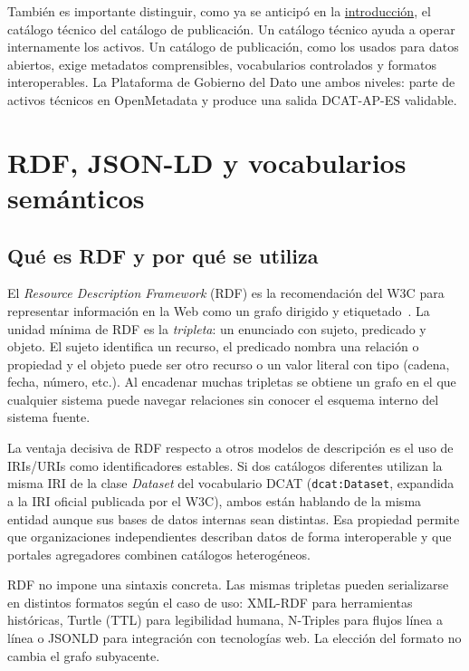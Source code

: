 También es importante distinguir, como ya se anticipó en la \hyperref[cap:introduccion]{introducción}, el catálogo técnico del catálogo de publicación. Un catálogo técnico ayuda a operar internamente los activos. Un catálogo de publicación, como los usados para datos abiertos, exige metadatos comprensibles, vocabularios controlados y formatos interoperables. La Plataforma de Gobierno del Dato une ambos niveles: parte de activos técnicos en OpenMetadata y produce una salida DCAT-AP-ES validable.

\section{RDF, JSON-LD y vocabularios semánticos}\label{sec:rdf-semantica}

\subsection{Qué es RDF y por qué se utiliza}

El \emph{Resource Description Framework} (\acs{RDF}) es la recomendación del \ac{W3C} para representar información en la Web como un grafo dirigido y etiquetado~\cite{w3cRdf11}. La unidad mínima de \ac{RDF} es la \emph{tripleta}: un enunciado con sujeto, predicado y objeto. El sujeto identifica un recurso, el predicado nombra una relación o propiedad y el objeto puede ser otro recurso o un valor literal con tipo (cadena, fecha, número, etc.). Al encadenar muchas tripletas se obtiene un grafo en el que cualquier sistema puede navegar relaciones sin conocer el esquema interno del sistema fuente.

La ventaja decisiva de \ac{RDF} respecto a otros modelos de descripción es el uso de \acp{IRI}/\acp{URI} como identificadores estables. Si dos catálogos diferentes utilizan la misma \ac{IRI} de la clase \emph{Dataset} del vocabulario \ac{DCAT} (\texttt{dcat:Dataset}, expandida a la \ac{IRI} oficial publicada por el \ac{W3C}), ambos están hablando de la misma entidad aunque sus bases de datos internas sean distintas. Esa propiedad permite que organizaciones independientes describan datos de forma interoperable y que portales agregadores combinen catálogos heterogéneos.

\ac{RDF} no impone una sintaxis concreta. Las mismas tripletas pueden serializarse en distintos formatos según el caso de uso: \ac{XML}-RDF para herramientas históricas, Turtle (\ac{TTL}) para legibilidad humana, N-Triples para flujos línea a línea o \ac{JSONLD} para integración con tecnologías web. La elección del formato no cambia el grafo subyacente.

